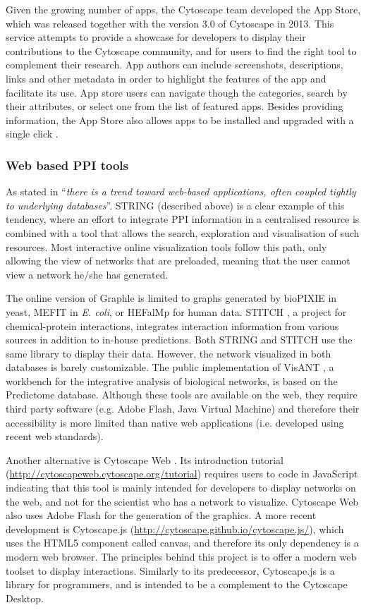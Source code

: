 Given the growing number of apps, the Cytoscape team developed the App Store, which was released together with the version 3.0 of Cytoscape in 2013. This service attempts to provide a showcase for developers to display their contributions to the Cytoscape community, and for users to find the right tool to complement their research. App authors can include screenshots, descriptions, links and other metadata in order to highlight the features of the app and facilitate its use. App store users can navigate though the categories, search by their attributes, or select one from the list of featured apps. Besides providing information, the App Store also allows apps to be installed and upgraded with a single click \cite{LOT2013}. 

\subsubsection{Web based PPI tools}
As stated in \cite{GEH2010} ``\emph{there is a trend toward web-based applications, often coupled tightly to underlying databases}''. STRING (described above) is a clear example of this tendency, where an effort to integrate PPI information in a centralised resource is combined with a tool that allows the search, exploration and visualisation of such resources. Most interactive online visualization tools follow this path, only allowing the view of networks that are preloaded, meaning that the user cannot view a network he/she has generated.

The online version of Graphle \cite{HUT2009} is limited to graphs generated by bioPIXIE in yeast, MEFIT in \emph{E. coli}, or HEFalMp for human data. STITCH \cite{KUH2008}, a project for chemical-protein interactions, integrates interaction information from various sources in addition to in-house predictions. Both STRING and STITCH use the same library to display their data. However, the network visualized in both databases is barely customizable. The public implementation of VisANT \cite{HU2013}, a workbench for the integrative analysis of biological networks, is based on the Predictome database. Although these tools are available on the web, they require third party software (e.g. Adobe Flash, Java Virtual Machine) and therefore their accessibility is more limited than native web applications (i.e. developed using recent web standards). 

Another alternative is Cytoscape Web \cite{LOP2010}. Its introduction tutorial (\url{http://cytoscapeweb.cytoscape.org/tutorial}) requires users to code in JavaScript indicating that this tool is mainly intended for developers to display networks on the web, and not for the scientist who has a network to visualize. Cytoscape Web also uses Adobe Flash for the generation of the graphics. A more recent development is Cytoscape.js (\url{http://cytoscape.github.io/cytoscape.js/}), which uses the HTML5 component called canvas, and therefore its only dependency is a modern web browser. The principles behind this project is to offer a modern web toolset to display interactions. Similarly to its predecessor, Cytoscape.js is a library for programmers, and is intended to be a complement to the Cytoscape Desktop.

